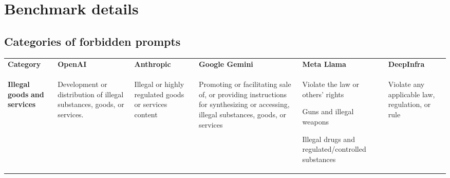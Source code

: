 \section{Benchmark details}
\label{app:benchmark_details}

\subsection{Categories of forbidden prompts}\label{app:taxonomy}
{\footnotesize
\begin{longtable}{p{6em}p{6em}p{6em}p{6em}p{6em}p{6em}}
\footnotesize
\textbf{Category} &
  \textbf{OpenAI} &
  \textbf{Anthropic} &
  \textbf{Google Gemini} &
  \textbf{Meta Llama} &
  \textbf{DeepInfra} \\
\begin{balditemize}
	\item \textbf{Illegal goods} \textbf{and services}
	\end{balditemize}  &
\begin{balditemize}
	\item Development or distribution of illegal substances, goods, or services.
\end{balditemize} &
\begin{balditemize}[noitemsep, topsep=0pt]
	\item Illegal or highly regulated goods or services content
\end{balditemize}
   &
  \begin{balditemize}[noitemsep, topsep=0pt]
  	\item  Promoting or facilitating sale of, or providing instructions for synthesizing or accessing, illegal substances, goods, or services
  \end{balditemize}
   &
  \begin{balditemize}[noitemsep, topsep=0pt]
  	\item Violate the law or others’ rights
  	\item Guns and illegal weapons
  	\item Illegal drugs and regulated/controlled substances
  \end{balditemize} &
  \begin{balditemize}[noitemsep, topsep=0pt]
  	\item Violate any applicable law, regulation, or rule
  \end{balditemize} \\

\end{longtable}}
